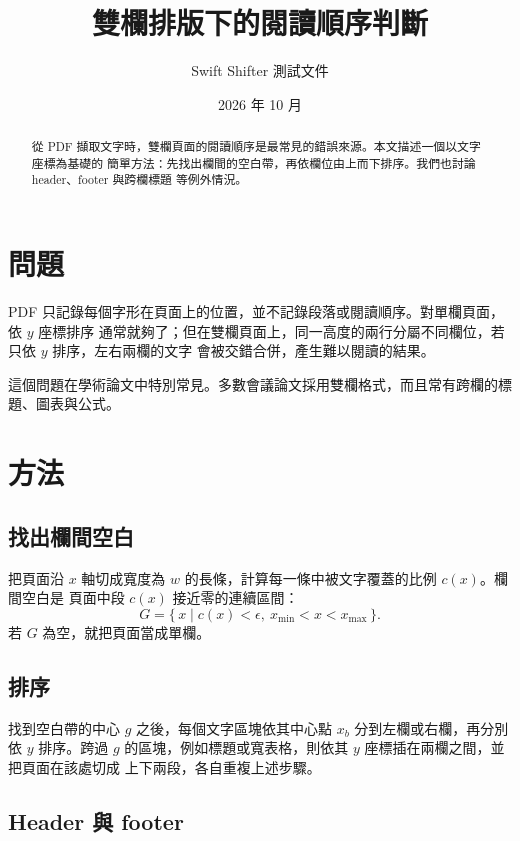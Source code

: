 \documentclass[10pt,twocolumn]{ctexart}
\title{雙欄排版下的閱讀順序判斷}
\author{Swift Shifter 測試文件}
\date{2026 年 10 月}
\begin{document}
\maketitle

\begin{abstract}
從 PDF 擷取文字時，雙欄頁面的閱讀順序是最常見的錯誤來源。本文描述一個以文字座標為基礎的
簡單方法：先找出欄間的空白帶，再依欄位由上而下排序。我們也討論 header、footer 與跨欄標題
等例外情況。
\end{abstract}

\section{問題}

PDF 只記錄每個字形在頁面上的位置，並不記錄段落或閱讀順序。對單欄頁面，依 $y$ 座標排序
通常就夠了；但在雙欄頁面上，同一高度的兩行分屬不同欄位，若只依 $y$ 排序，左右兩欄的文字
會被交錯合併，產生難以閱讀的結果。

這個問題在學術論文中特別常見。多數會議論文採用雙欄格式，而且常有跨欄的標題、圖表與公式。

\section{方法}

\subsection{找出欄間空白}

把頁面沿 $x$ 軸切成寬度為 $w$ 的長條，計算每一條中被文字覆蓋的比例 $c(x)$。欄間空白是
頁面中段 $c(x)$ 接近零的連續區間：
\begin{equation}
  G = \{\, x \mid c(x) < \epsilon,\ x_{\min} < x < x_{\max} \,\}.
\end{equation}
若 $G$ 為空，就把頁面當成單欄。

\subsection{排序}

找到空白帶的中心 $g$ 之後，每個文字區塊依其中心點 $x_b$ 分到左欄或右欄，再分別依 $y$
排序。跨過 $g$ 的區塊，例如標題或寬表格，則依其 $y$ 座標插在兩欄之間，並把頁面在該處切成
上下兩段，各自重複上述步驟。

\subsection{Header 與 footer}
\end{document}
